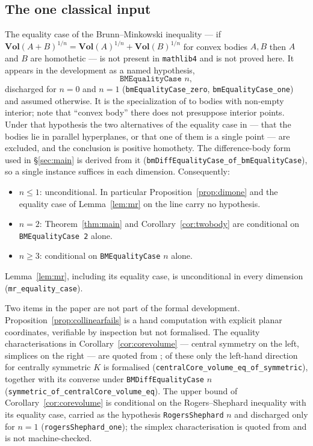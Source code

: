 \documentclass[12pt]{article}
\theoremstyle{definition}
\newcommand{\Vol}{\mathbf{Vol}}
\begin{document}
\subsection{The one classical input}\label{app:conditional}

The equality case of the Brunn--Minkowski inequality --- if
$\Vol(A+B)^{1/n}=\Vol(A)^{1/n}+\Vol(B)^{1/n}$ for convex bodies $A,B$ then $A$
and $B$ are homothetic \cite[Thm.~7.1.1]{schneider} --- is not present in
\texttt{mathlib4} and is not proved here.  It appears in the development as a
named hypothesis,
\[
  \texttt{BMEqualityCase } n ,
\]
discharged for $n=0$ and $n=1$ (\texttt{bmEqualityCase\_zero},
\texttt{bmEqualityCase\_one}) and assumed otherwise.  It is the
specialization of \cite[Thm.~7.1.1]{schneider} to bodies with non-empty
interior; note that ``convex body'' there does not presuppose interior
points.  Under that hypothesis the two alternatives of the equality case
in \cite{schneider} --- that the bodies lie in parallel hyperplanes, or
that one of them is a single point --- are excluded, and the conclusion is
positive homothety.  The difference-body form
used in \S\ref{sec:main} is derived from it
(\texttt{bmDiffEqualityCase\_of\_bmEqualityCase}), so a single instance suffices
in each dimension.  Consequently:

\begin{itemize}
\item $n\le 1$: unconditional.  In particular Proposition~\ref{prop:dimone} and
  the equality case of Lemma~\ref{lem:mr} on the line carry no hypothesis.
\item $n=2$: Theorem~\ref{thm:main} and Corollary~\ref{cor:twobody} are
  conditional on \texttt{BMEqualityCase 2} alone.
\item $n\ge 3$: conditional on \texttt{BMEqualityCase} $n$ alone.
\end{itemize}

Lemma~\ref{lem:mr}, including its equality case, is unconditional in every
dimension (\texttt{mr\_equality\_case}).

Two items in the paper are not part of the formal development.
Proposition~\ref{prop:collinearfails} is a hand computation with explicit
planar coordinates, verifiable by inspection but not formalised.  The equality
characterisations in Corollary~\ref{cor:corevolume} --- central symmetry on the
left, simplices on the right --- are quoted from
\cite{gardner,schneider,rogersshephard}; of these only the left-hand direction
for centrally symmetric $K$ is formalised
(\texttt{centralCore\_volume\_eq\_of\_symmetric}), together with its converse
under \texttt{BMDiffEqualityCase} $n$
(\texttt{symmetric\_of\_centralCore\_volume\_eq}).  The upper bound of
Corollary~\ref{cor:corevolume} is conditional on the Rogers--Shephard inequality
with its equality case, carried as the hypothesis \texttt{RogersShephard} $n$
and discharged only for $n=1$ (\texttt{rogersShephard\_one}); the simplex
characterisation is quoted from \cite{rogersshephard} and is not machine-checked.
\end{document}
